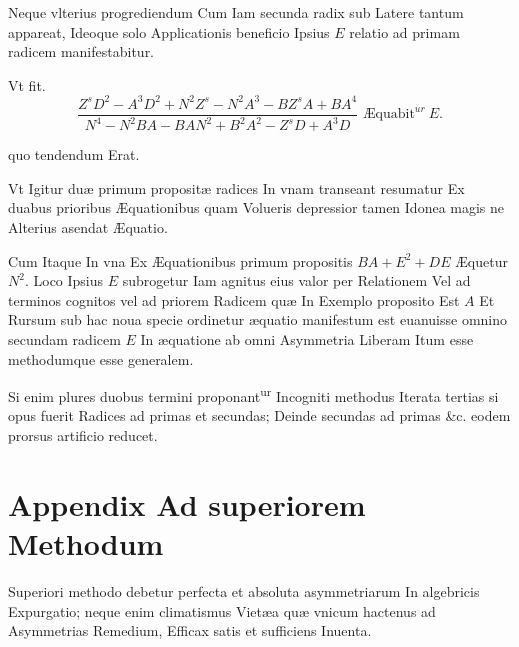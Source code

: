 \documentclass[11pt,a4paper]{article}
\begin{document}
Neque vlterius progrediendum Cum Iam secunda radix sub Latere tantum appareat, Ideoque solo Applicationis beneficio Ipsius $E$ relatio ad primam radicem manifestabitur.

Vt fit.
\[ \frac{Z^sD^2 - A^3D^2 + N^2Z^s - N^2A^3 - BZ^sA + BA^4}{N^4 - N^2BA - BAN^2 + B^2A^2 - Z^sD + A^3D} \text{ Æquabit}^{ur}\ E. \]

quo tendendum Erat.

Vt Igitur duæ primum propositæ radices In vnam transeant resumatur Ex duabus prioribus Æquationibus quam Volueris depressior tamen Idonea magis ne Alterius asendat Æquatio.

Cum Itaque In vna Ex Æquationibus primum propositis $BA + E^2 + DE$ Æquetur $N^2$. Loco Ipsius $E$ subrogetur Iam agnitus eius valor per Relationem Vel ad terminos cognitos vel ad priorem Radicem quæ In Exemplo proposito Est $A$ Et Rursum sub hac noua specie ordinetur æquatio manifestum est euanuisse omnino secundam radicem $E$ In æquatione ab omni Asymmetria Liberam Itum esse methodumque esse generalem.

Si enim plures duobus termini proponant\textsuperscript{ur} Incogniti methodus Iterata tertias si opus fuerit Radices ad primas et secundas; Deinde secundas ad primas \&c. eodem prorsus artificio reducet.


\section*{Appendix Ad superiorem Methodum}

Superiori methodo debetur perfecta et absoluta asymmetriarum In algebricis Expurgatio; neque enim  climatismus Vietæa quæ vnicum hactenus ad Asymmetrias  Remedium, Efficax satis et sufficiens Inuenta.
\end{document}
